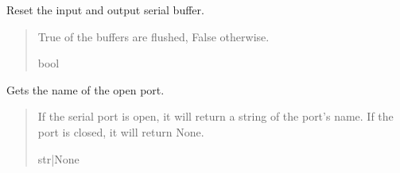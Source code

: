 \documentclass[letterpaper,10pt,english]{sphinxmanual}
\begin{document}
\begin{fulllineitems}

\begin{fulllineitems}
\label{\detokenize{PodApi.Devices.SerialPorts:PodApi.Devices.SerialPorts.SerialComm.PortIO.Flush}}
\pysigstartsignatures
{}
\pysigstopsignatures
\sphinxAtStartPar
Reset the input and output serial buffer.
\begin{quote}\begin{description}
\sphinxAtStartPar
True of the buffers are flushed, False otherwise.

\sphinxAtStartPar
bool

\end{description}\end{quote}

\end{fulllineitems}


\begin{fulllineitems}
\label{\detokenize{PodApi.Devices.SerialPorts:PodApi.Devices.SerialPorts.SerialComm.PortIO.GetPortName}}
\pysigstartsignatures
{}
\pysigstopsignatures
\sphinxAtStartPar
Gets the name of the open port.
\begin{quote}\begin{description}
\sphinxAtStartPar
If the serial port is open, it will return a string of the port’s name.                 If the port is closed, it will return None.

\sphinxAtStartPar
str|None

\end{description}\end{quote}

\end{fulllineitems}



\end{fulllineitems}
\end{document}
